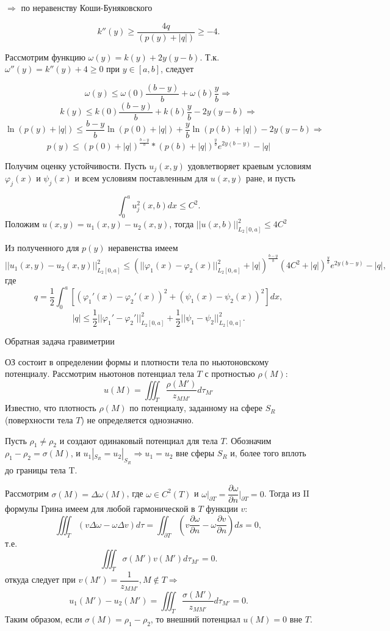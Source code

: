 \documentclass{article}
\begin{document}
$\Rightarrow $ по неравенству Коши-Буняковского

\[
k''(y) \geqslant \dfrac{4q}{(p(y) + |q|)} \geqslant -4.
\]

Рассмотрим функцию $\omega(y) = k(y) + 2y(y-b)$. Т.к. $\omega '' (y) = k''(y) + 4 \geqslant 0 $ при $y \in [a,b]$, следует

\[
\omega(y) \leqslant \omega(0)\dfrac{(b-y)}{b} + \omega(b) \dfrac{y}{b} \Rightarrow
\]
\[
k(y) \leqslant k(0)\dfrac{(b-y)}{b} + k(b)\dfrac{y}{b} - 2y(y-b) \Rightarrow
\]
\[
\ln (p(y) +|q|) \leqslant \dfrac{b-y}{b} \ln (p(0) + |q|) + \frac{y}{b} \ln(p(b) +|q|) - 2y(y-b) \Rightarrow
\]
\[
p(y) \leqslant (p(0) + |q|)^{\frac{b-y}{b}} * (p(b) +|q|)^{\frac{y}{b}} e^{2y(b-y)} - |q|
\]

Получим оценку устойчивости.
Пусть $u_j(x,y)$ удовлетворяет краевым условиям $\varphi_j(x)$ и $\psi_j(x)$ и всем условиям поставленным для $u(x,y)$ ране, и пусть

\[
\int_0^a u_j^2(x,b)dx \leqslant C^2.
\]
Положим $u(x,y) = u_1(x,y) - u_2(x,y)$, тогда  $|| u(x,b)||_{L_2[0,a]}^2 \leqslant 4 C^2$

Из полученного для $p(y)$ неравенства имеем
\[
||u_1(x,y) - u_2(x,y) ||_{L_2[0,a]}^2 \leqslant (|| \varphi_1(x) - \varphi_2(x)||_{L_2[0,a]}^2 + |q|) ^{\frac{b-y}{b}} (4C^2 +|q|)^{\frac{y}{b}} e^{2y(b-y)} - |q|,
\]
где
\[
q = \dfrac{1}{2} \int_0^a [(\varphi_1'(x) - \varphi_2'(x))^2 + (\psi_1(x) - \psi_2(x))^2 ] dx,
\]
\[
|q| \leqslant \dfrac{1}{2} ||\varphi_1' - \varphi_2'||_{L_2[0,a]}^2 + \dfrac{1}{2} ||\psi_1 - \psi_2||_{L_2[0,a]}^2.
\]


\vspace{1cm}
\newpage
\centerline{\large Обратная задача гравиметрии}

ОЗ состоит в определении формы и плотности тела по ньютоновскому потенциалу. Рассмотрим ньютонов потенциал тела $T$ с протностью $\rho(M)$:
\[
u(M) = \iiint_T \dfrac{\rho(M')}{z_{MM'}}d\tau_{M'}
\]
Известно, что плотность $\rho(M)$ по потенциалу, заданному на сфере $S_R$ (поверхности тела $T$) не определяется однозначно.

Пусть $\rho_1 \neq \rho_2$ и создают одинаковый потенциал для тела $T$. Обозначим $\rho_1 - \rho_2 = \sigma(M)$, и $u_1|_{S_R} = u_2|_{S_R} \Rightarrow u_1 = u_2$ вне сферы $S_R$ и, более того вплоть до границы тела T.

Рассмотрим $\sigma(M) = \Delta \omega(M)$, где $ \omega \in C^2(T)$ и $\omega|_{\partial T} = \dfrac{\partial \omega}{\partial n} \bigg|_{\partial T} = 0$. Тогда из II формулы Грина имеем для любой гармонической в $T$ функции $v$: 
\[
\iiint_T (v \Delta \omega - \omega \Delta v) d\tau = \iint_{\partial T} (v \dfrac{\partial \omega}{\partial n} - \omega \dfrac{\partial v}{\partial n} ) ds = 0, 
\]
т.е.
\[
\iiint_T \sigma(M') v(M') d \tau_{M'} = 0.
\]
откуда следует при $v(M') = \dfrac{1}{z_{MM'}}, M \nin T \Rightarrow$
\[
u_1(M') - u_2(M')= \iiint_T \dfrac{\sigma(M')}{z_{MM'}}d\tau_{M'} = 0.
\]
Таким образом, если $\sigma(M) = \rho_1 - \rho_2$, то внешний потенциал $u(M) = 0$ вне $T$.
\end{document}
